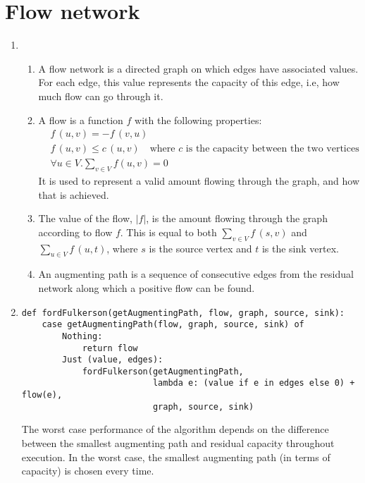 \documentclass[11pt]{article}
\begin{document}
\section{Flow network}
\begin{enumerate}
\item
  \begin{enumerate}
  \item A flow network is a directed graph on which edges have associated values. For each edge, this value represents the capacity of this edge, i.e, how much flow can go through it.
  \item
    A flow is a function \(f\) with the following properties:
    \begin{align}
      &f\,(u,v)=-f\,(v,u) \\
      &f\,(u,v)\leq c\,(u,v) \quad \textrm{where }c\textrm{ is the capacity between the two vertices}\\
      &\forall u\in V.\sum_{v\in V}f(u,v)=0
    \end{align}
    It is used to represent a valid amount flowing through the graph, and how that is achieved.
  \item The value of the flow, \(|f|\), is the amount flowing through the graph according to flow \(f\). This is equal to both \(\sum_{v\in V}f\,(s,v)\) and \(\sum_{u\in V}f\,(u,t)\), where \(s\) is the source vertex and \(t\) is the sink vertex.
    \setcounter{enumii}{5}
  \item An augmenting path is a sequence of consecutive edges from the residual network along which a positive flow can be found.
  \end{enumerate}
\item
  \begin{lstlisting}
def fordFulkerson(getAugmentingPath, flow, graph, source, sink):
    case getAugmentingPath(flow, graph, source, sink) of
        Nothing:
            return flow
        Just (value, edges):
            fordFulkerson(getAugmentingPath,
                          lambda e: (value if e in edges else 0) + flow(e),
                          graph, source, sink)
  \end{lstlisting}
  The worst case performance of the algorithm depends on the difference between the smallest augmenting path and residual capacity throughout execution. In the worst case, the smallest augmenting path (in terms of capacity) is chosen every time.


\end{enumerate}
\end{document}
